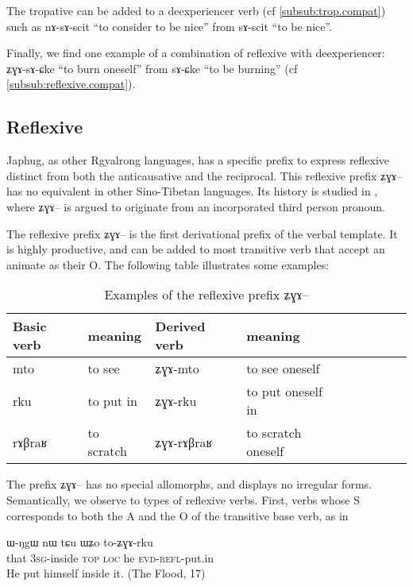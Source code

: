 \documentclass[oldfontcommands,oneside,a4paper,11pt]{memoir}
\newcommand{\ipa}[1]{{\phon #1}} %
\newcommand{\evd}{\textsc{evd}}
\newcommand{\loc}{\textsc{loc}}
\newcommand{\refl}{\textsc{refl}}
\newcommand{\sg}{\textsc{sg}}
\newcommand{\topic}{\textsc{top}}
\begin{document}
The tropative can be added to a deexperiencer verb (cf \ref{subsub:trop.compat}) such as \ipa{nɤ-sɤ-scit} ``to consider to be nice'' from \ipa{sɤ-scit} ``to be nice''.

Finally, we find one example of a combination of reflexive with deexperiencer: \ipa{ʑɣɤ-sɤ-ɕke} ``to burn oneself'' from \ipa{sɤ-ɕke} ``to be burning'' (cf \ref{subsub:reflexive.compat}).



\subsection{Reflexive} \label{sub:reflexive}
Japhug, as other Rgyalrong languages, has a specific prefix to express reflexive distinct from both the anticausative and the reciprocal. This reflexive prefix  \ipa{ʑɣɤ}-- has no equivalent in other Sino-Tibetan languages. Its history is studied in \citet{jacques10refl}, where  \ipa{ʑɣɤ}-- is argued to originate from an incorporated  third person pronoun.


The reflexive prefix \ipa{ʑɣɤ}-- is the first derivational prefix of the verbal template. It is highly productive, and can be added to most transitive verb that accept an animate as their O. The following table illustrates some examples:

\begin{table}[H]
\caption{Examples of the reflexive prefix \ipa{ʑɣɤ}-- }\label{tab:refl}
\begin{tabular}{lllllllll} \toprule
 
Basic verb	&meaning	&Derived verb	&meaning\\
\midrule
\ipa{mto}  &	  to see	& \ipa{ʑɣɤ-mto}  &	  to see oneself \\ 
\ipa{rku}  &	to put in	& \ipa{ʑɣɤ-rku}  &	  to put oneself in \\
\ipa{rɤβraʁ}  &	  to scratch	& \ipa{ʑɣɤ-rɤβraʁ}  &	  to scratch oneself \\  
\bottomrule
\end{tabular}
\end{table}
The prefix \ipa{ʑɣɤ}-- has no special allomorphs, and displays no irregular forms. Semantically, we observe to types of reflexive verbs. First, verbs whose S corresponds to both the A and the O of the transitive base verb, as in 
   \begin{exe}
\ex
\gll \ipa{nɯnɯ} 	\ipa{ɯ-ŋgɯ} 	\ipa{nɯ} 	\ipa{tɕu} 	\ipa{ɯʑo} 	\ipa{to-ʑɣɤ-rku}    \\
that 3\sg{}-inside \topic{} \loc{} he \evd{}-\refl{}-put.in    \\
  \glt He put himself inside it. (The Flood, 17)
   \end{exe}
 
\end{document}
